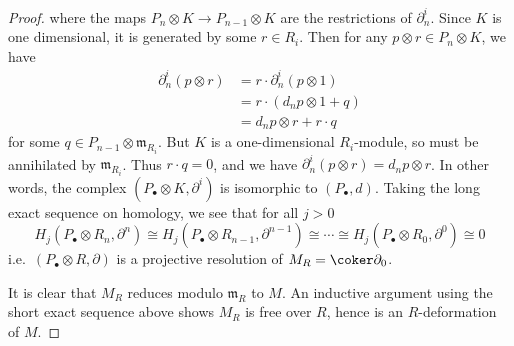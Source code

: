 \begin{lemma}
\begin{proof}
        where the maps \(P_n\otimes K\rightarrow P_{n-1}\otimes K\) are the
        restrictions of \(\partial_n^i\). Since \(K\) is one dimensional, it is
        generated by some \(r\in R_i\). Then for any \(p\otimes r\in
        P_n\otimes K\), we have 
        \begin{align*} 
            \partial^i_n (p\otimes r) &= r\cdot \partial_n^i(p\otimes 1)\\
                                    &= r\cdot (d_np\otimes 1 + q) \\ 
                                    &= d_np \otimes r +  r\cdot q
        \end{align*}
        for some \(q\in P_{n-1}\otimes \mathfrak{m}_{R_i}\).
        But \(K\) is a one-dimensional \(R_i\)-module, so must be annihilated
        by \(\mathfrak{m}_{R_i}\). Thus \( r\cdot q = 0\),
        and we have \(\partial^i_n(p\otimes r) = d_n p \otimes r\). In other
        words, the complex \((P_\bullet \otimes K,\partial^i)\) is
        isomorphic to \((P_\bullet, d)\). Taking the long exact sequence
        on homology, we see that for all \(j>0\)
        \[H_j(P_\bullet\otimes R_n, \partial^n) \cong
        H_j(P_\bullet\otimes R_{n-1}, \partial^{n-1})  \cong \cdots
        \cong H_j(P_\bullet\otimes R_{0}, \partial^{0}) \cong 0\]
        i.e.\ \((P_\bullet \otimes R, \partial)\) is a projective
        resolution of \(M_R=\coker \partial_0\). 

        It is clear that \(M_R\) reduces modulo \(\mathfrak{m}_R\) to
        \(M\). An inductive argument using the short exact sequence above shows
        \(M_R\) is free over \(R\), hence is an \(R\)-deformation of
        \(M\).
    \end{proof}
\end{lemma}

